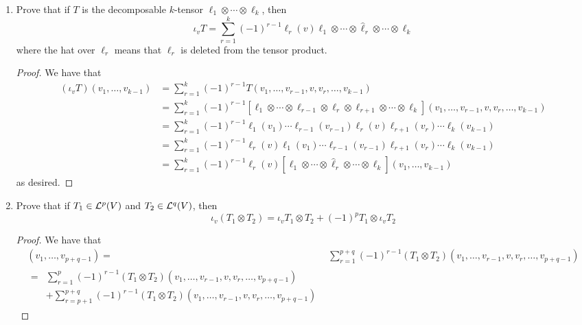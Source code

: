 \documentclass[../psets.tex]{subfiles}
\begin{document}
\begin{enumerate}[label={\textbf{1.7.\roman*.}}]
    \item Prove that if $T$ is the decomposable $k$-tensor $\ell_1\otimes\cdots\otimes\ell_k$, then
    \begin{equation*}
        \iota_vT = \sum_{r=1}^k(-1)^{r-1}\ell_r(v)\ell_1\otimes\cdots\otimes\hat{\ell}_r\otimes\cdots\otimes\ell_k
    \end{equation*}
    where the hat over $\ell_r$ means that $\ell_r$ is deleted from the tensor product.
    \begin{proof}
        We have that
        \begin{align*}
            (\iota_vT)(v_1,\dots,v_{k-1}) &= \sum_{r=1}^k(-1)^{r-1}T(v_1,\dots,v_{r-1},v,v_r,\dots,v_{k-1})\\
            &= \sum_{r=1}^k(-1)^{r-1}[\ell_1\otimes\cdots\otimes\ell_{r-1}\otimes\ell_r\otimes\ell_{r+1}\otimes\cdots\otimes\ell_k](v_1,\dots,v_{r-1},v,v_r,\dots,v_{k-1})\\
            &= \sum_{r=1}^k(-1)^{r-1}\ell_1(v_1)\cdots\ell_{r-1}(v_{r-1})\ell_r(v)\ell_{r+1}(v_r)\cdots\ell_k(v_{k-1})\\
            &= \sum_{r=1}^k(-1)^{r-1}\ell_r(v)\ell_1(v_1)\cdots\ell_{r-1}(v_{r-1})\ell_{r+1}(v_r)\cdots\ell_k(v_{k-1})\\
            &= \sum_{r=1}^k(-1)^{r-1}\ell_r(v)[\ell_1\otimes\cdots\otimes\hat{\ell}_r\otimes\cdots\otimes\ell_k](v_1,\dots,v_{k-1})
        \end{align*}
        as desired.
    \end{proof}
    \item Prove that if $T_1\in\lin[p]{V}$ and $T_2\in\lin[q]{V}$, then
    \begin{equation*}
        \iota_v(T_1\otimes T_2) = \iota_vT_1\otimes T_2+(-1)^pT_1\otimes\iota_vT_2
    \end{equation*}
    \begin{proof}
        We have that
        \begin{align*}
            [\iota_v(T_1\otimes T_2)](v_1,\dots,v_{p+q-1}) ={}& \sum_{r=1}^{p+q}(-1)^{r-1}(T_1\otimes T_2)(v_1,\dots,v_{r-1},v,v_r,\dots,v_{p+q-1})\\
            \begin{split}
                ={}& \sum_{r=1}^p(-1)^{r-1}(T_1\otimes T_2)(v_1,\dots,v_{r-1},v,v_r,\dots,v_{p+q-1})\\
                &+\sum_{r=p+1}^{p+q}(-1)^{r-1}(T_1\otimes T_2)(v_1,\dots,v_{r-1},v,v_r,\dots,v_{p+q-1})

\end{split}
\end{align*}
\end{proof}
\end{enumerate}
\end{document}
